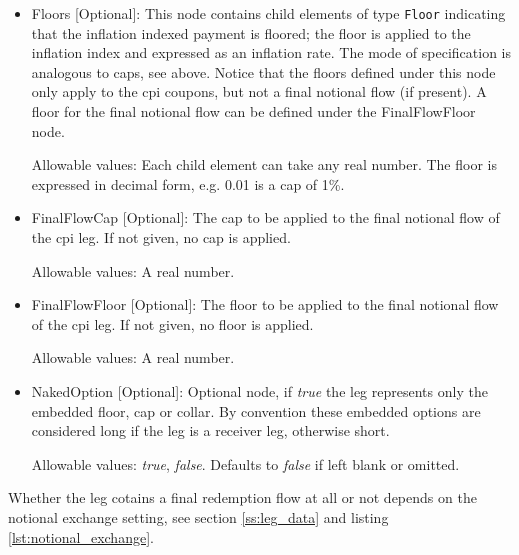 \begin{itemize}
\item Floors [Optional]: This node contains child elements of type
  \lstinline!Floor! indicating that the inflation indexed payment is
  floored; the floor is applied to the inflation index and expressed as
  an inflation rate. The mode of specification is analogous to caps, see
  above. Notice that the floors defined under this node only apply to the cpi coupons,
  but not a final notional flow (if present). A floor for the final notional flow can be defined
  under the FinalFlowFloor node.

Allowable values: Each child element can take any real number. The floor is
expressed in decimal form, e.g. 0.01 is a cap of 1\%.

\item FinalFlowCap [Optional]: The cap to be applied to the final notional flow of the cpi leg. If not given, no cap
  is applied.

Allowable values: A real number.

\item FinalFlowFloor [Optional]: The floor to be applied to the final notional flow of the cpi leg. If not given, no floor
  is applied.

Allowable values: A real number.

\item NakedOption [Optional]: Optional node, if \emph{true} the leg represents only the embedded floor, cap or collar. 
By convention these embedded options are considered long if the leg is a receiver leg, otherwise short. 
 
 Allowable values:  \emph{true}, \emph{false}. Defaults to \emph{false} if left blank or omitted.
 
\end{itemize} 

Whether the leg cotains a final redemption flow at all or not depends on the
 notional exchange setting, see section \ref{ss:leg_data} and listing \ref{lst:notional_exchange}.

